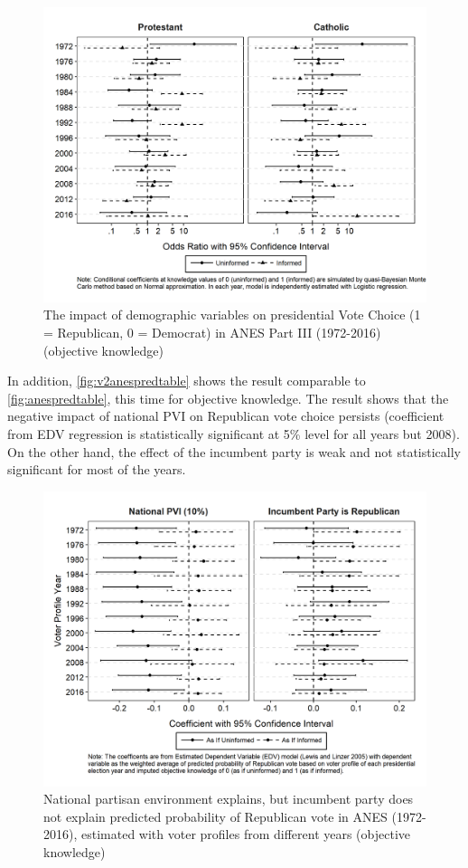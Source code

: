 \begin{figure}[ht!!!]
    \caption{The impact of demographic variables on presidential Vote Choice (1 = Republican, 0 = Democrat) in ANES Part III (1972-2016) (objective knowledge)}
    \label{fig:v2anescoefplot_dem3}
    \includegraphics[width=\linewidth]{../outputs/m2sq_anescoefplot_dem3.png}
\end{figure}

\par In addition, \autoref{fig:v2anespredtable} shows the result comparable to \autoref{fig:anespredtable}, this time for objective knowledge. The result shows that the negative impact of national PVI on Republican vote choice persists (coefficient from EDV regression is statistically significant at 5\% level for all years but 2008). On the other hand, the effect of the incumbent party is weak and not statistically significant for most of the years.   

\begin{figure}[ht!!!]
    \caption{National partisan environment explains, but incumbent party does not explain predicted probability of Republican vote in ANES (1972-2016), estimated with voter profiles from different years (objective knowledge)}
    \label{fig:v2anespredtable}
    \includegraphics[width=\linewidth]{../outputs/m2sq_anespredtable.png}
\end{figure}


